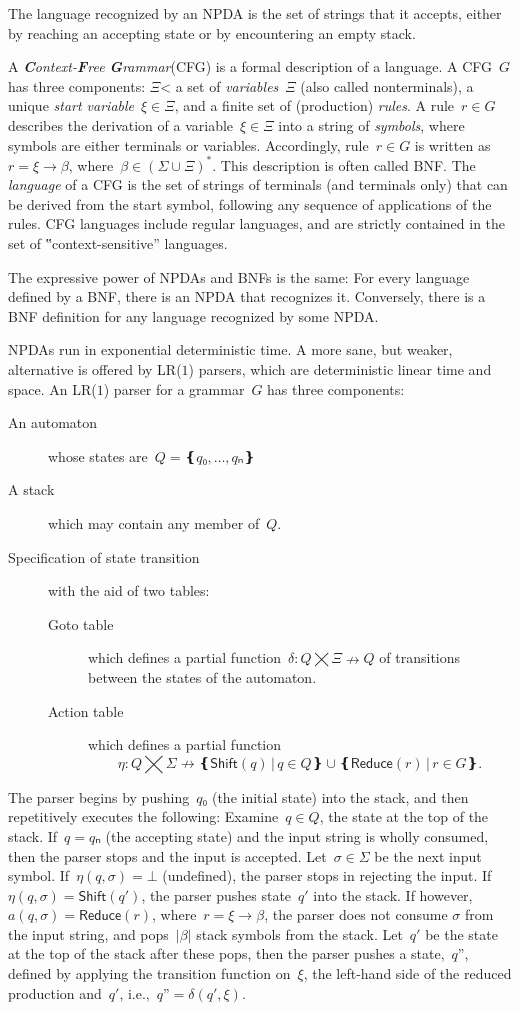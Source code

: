 The language recognized by an NPDA is the set of strings that it accepts,
  either by reaching an accepting state or by encountering an empty stack.

A \emph{\textbf Context-\textbf Free \textbf Grammar}(CFG) is a formal description of a language.
A CFG~$G$ has three components: $\Xi$< a set of \emph{variables}~$Ξ$ (also called nonterminals), 
  a unique \emph{start variable}~$ξ∈Ξ$, and a finite set of (production) \emph{rules}.
A rule~$r∈G$ describes the derivation of a variable~$ξ∈Ξ$ into
  a string of \emph{symbols}, where symbols are either terminals or variables.
Accordingly, rule~$r∈G$ is written as~$r=ξ→β$, where~$β∈\left(Σ∪Ξ\right)^*$.
This description is often called BNF.
The \emph{language} of a CFG is the set of strings of terminals (and terminals only)
  that can be derived from the start symbol, following any sequence of applications of the rules.
CFG languages include regular languages, and are strictly contained in the set
  of ‟context-sensitive” languages.

The expressive power of NPDAs and BNFs is the same:
  For every language defined by a BNF, there is an NPDA that recognizes it.
Conversely, there is a BNF definition for any language recognized by some NPDA.

NPDAs run in exponential deterministic time.
A more sane, but weaker, alternative is offered by LR($1$) parsers, 
  which are deterministic linear time and space.
An LR($1$) parser for a grammar~$G$ has three components:
\begin{description}
  \item[An automaton] whose states are~$Q=❴q₀,…,qₙ❵$
  \item[A stack] which may contain any member of~$Q$.
  \item[Specification of state transition] with the aid of two tables:
        \begin{description}
          \item[Goto table] which defines a partial function~$δ:Q⨉Ξ↛Q$ of transitions
          between the states of the automaton.
          \item[Action table] which
            defines a partial function\[η:Q⨉Σ↛ ❴ \textsf{Shift}(q) \,|\, q∈Q❵ ∪ ❴\textsf{Reduce}(r) \,| \, r∈G❵.\]
        \end{description}
\end{description}
The parser begins by pushing~$q₀$ (the initial state) into the stack,
and then repetitively executes the following:
Examine~$q∈Q$, the state at the top of the stack.
If~$q=qₙ$ (the accepting state) and the input string is wholly consumed, then the parser stops and the input is accepted.
Let~$σ∈Σ$ be the next input symbol.
If~$η(q,σ)=⊥$ (undefined), the parser stops in rejecting the input.
If~$η(q,σ) = \textsf{Shift}(q')$, the parser pushes state~$q'$ into the stack.
If however,~$a(q,σ) = \textsf{Reduce}(r)$,
where~$r=ξ→β$, the parser does not consume $\sigma$ from the input string,
  and pops~$|β|$ stack symbols from the stack.
Let~$q'$ be the state at the top of the stack after these pops, then
  the parser pushes a state,~$q”$,
  defined by applying the transition function on~$ξ$, the left-hand side of the reduced production and~$q'$, i.e.,~$q”=δ(q',ξ)$.

